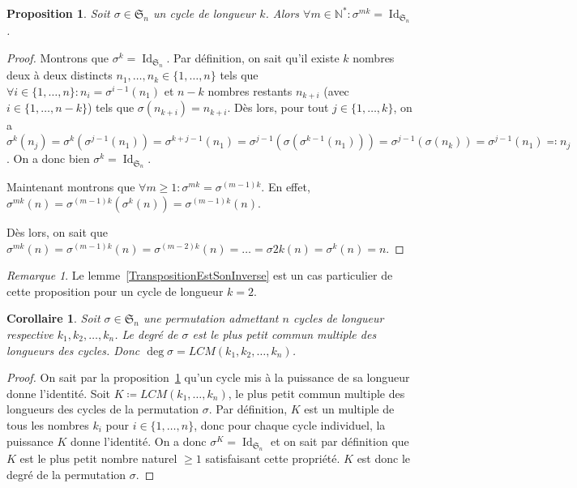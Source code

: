 \documentclass{article}
\DeclareMathOperator{\Id}{Id}
\newcommand{\N}{\mathbb N}
\newcommand{\Perm}{\mathfrak{S}}
\newtheorem{prp}[thm]{Proposition}
\newtheorem{cor}[thm]{Corollaire}
\theoremstyle{definition}
\theoremstyle{remark}
\newtheorem*{rmq}{Remarque}
\begin{document}
		\begin{prp}\label{PermPuissanceId} Soit $\sigma \in \Perm_n$ un cycle de longueur $k$. Alors $\forall m \in \N^* : \sigma^{mk} = \Id_{\Perm_n}$. \end{prp}

		\begin{proof} Montrons que $\sigma^k = \Id_{\Perm_n}$. Par définition, on sait qu'il existe $k$ nombres deux à deux distincts $n_1, \ldots, n_k \in \{1, \ldots, n\}$
		tels que $\forall i \in \{1, \ldots, n\} : n_i = \sigma^{i-1}(n_1)$ et $n-k$ nombres restants $n_{k+i}$ (avec $i \in \{1, \ldots, n-k\}$) tels que $\sigma(n_{k+i}) = n_{k+i}$.
		Dès lors, pour tout $j \in \{1, \ldots, k\}$, on a $\sigma^k(n_j) = \sigma^k\left(\sigma^{j-1}(n_1)\right) = \sigma^{k+j-1}(n_1) = \sigma^{j-1}\left(\sigma\left(\sigma^{k-1}(n_1)\right)\right)
		= \sigma^{j-1}\left(\sigma(n_k)\right) = \sigma^{j-1}(n_1) \eqqcolon n_j$. On a donc bien $\sigma^k = \Id_{\Perm_n}$.

		Maintenant montrons que $\forall m \geq 1 : \sigma^{mk} = \sigma^{(m-1)k}$. En effet, $\sigma^{mk}(n) = \sigma^{(m-1)k}\left(\sigma^k(n)\right) = \sigma^{(m-1)k}(n)$.

		Dès lors, on sait que $\sigma^{mk}(n) = \sigma^{(m-1)k}(n) = \sigma^{(m-2)k}(n) = \ldots = \sigma{2k}(n) = \sigma^k(n) = n$. \end{proof}

		\begin{rmq} Le lemme~\ref{TranspositionEstSonInverse} est un cas particulier de cette proposition pour un cycle de longueur $k = 2$. \end{rmq}

		\begin{cor} Soit $\sigma \in \Perm_n$ une permutation admettant $n$ cycles de longueur respective $k_1, k_2, \ldots, k_n$. Le degré de $\sigma$ est le plus petit
		commun multiple des longueurs des cycles. Donc $\deg \sigma = LCM(k_1, k_2, \ldots, k_n)$. \end{cor}

		\begin{proof} On sait par la proposition~\ref{PermPuissanceId} qu'un cycle mis à la puissance de sa longueur donne l'identité. Soit $K \coloneqq LCM(k_1, \ldots, k_n)$, le plus
		petit commun multiple des longueurs des cycles de la permutation $\sigma$. Par définition, $K$ est un multiple de tous les nombres $k_i$ pour $i \in \{1, \ldots, n\}$, donc pour chaque
		cycle individuel, la puissance $K$ donne l'identité. On a donc $\sigma^{K} = \Id_{\Perm_n}$ et on sait par définition que $K$ est le plus petit nombre naturel $\geq 1$ satisfaisant
		cette propriété. $K$ est donc le degré de la permutation $\sigma$. \end{proof}
\end{document}
